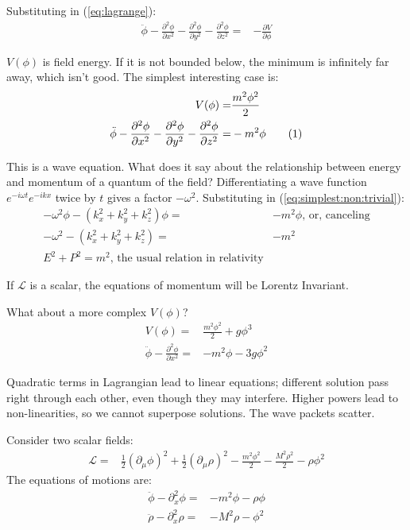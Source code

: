 \documentclass[]{article}
\newcommand\numberthis{\addtocounter{equation}{1}\tag{\theequation}}
\begin{document}
Substituting in (\ref{eq:lagrange}):
\begin{align*}
	\ddot{\phi} - \frac{\partial^2 \phi}{\partial x^2}  - \frac{\partial^2 \phi}{\partial y^2}  - \frac{\partial^2 \phi}{\partial z^2} =& - \frac{\partial V}{\partial \phi}
\end{align*}

$V(\phi)$ is field energy. If it is not bounded below, the minimum is infinitely far away, which isn't good.  The simplest interesting case is:
\begin{align*}
	V(\phi) =& \frac{m^2 \phi^2}{2}\\
	\ddot{\phi} - \frac{\partial^2 \phi}{\partial x^2}  - \frac{\partial^2 \phi}{\partial y^2}  - \frac{\partial^2 \phi}{\partial z^2} =& - m^2 \phi \numberthis \label{eq:simplest:non:trivial}
\end{align*}

This is a wave equation. What does it say about the relationship between energy and momentum of a quantum of the field? Differentiating a wave function $e^{-i \omega t} e^{-i k x}$ twice by $t$ gives a factor $-\omega^2$. Substituting in (\ref{eq:simplest:non:trivial}):
\begin{align*}
	-\omega^2 \phi - (k_x^2+k_y^2+k_z^2)\phi =& -m^2 \phi \text{, or, canceling}\\
	-\omega^2  - (k_x^2+k_y^2+k_z^2) =& -m^2 \\
	E^2 + P^2 = m^2 \text{, the usual relation in relativity}
\end{align*}

If $\mathcal{L}$ is a scalar, the equations of momentum will be Lorentz Invariant.

What about a more complex $V(\phi)$?
\begin{align*}
	V(\phi) =& \frac{m^2 \phi^2}{2} + g \phi^3\\
	\ddot{\phi} - \frac{\partial^2 \phi}{\partial x^2}  =& - m^2 \phi - 3 g \phi^2
\end{align*}

Quadratic terms in Lagrangian lead to linear equations; different solution pass right through each other, even though they may interfere. Higher powers lead to non-linearities, so we cannot superpose solutions. The wave packets scatter.

Consider two scalar fields:
\begin{align*}
	\mathcal{L} =& \frac{1}{2}(\partial_{\mu} \phi)^2 + \frac{1}{2}(\partial_{\mu} \rho)^2 - \frac{m^2 \phi^2}{2} - \frac{M^2 \rho^2}{2} - \rho \phi^2
\end{align*}
The equations of motions are:
\begin{align*}
	\ddot{\phi} - \partial_x^2 \phi =& -m^2 \phi - \rho \phi\\
	\ddot{\rho} - \partial_x^2 \rho =& -M^2 \rho -\phi^2
\end{align*}
\end{document}
